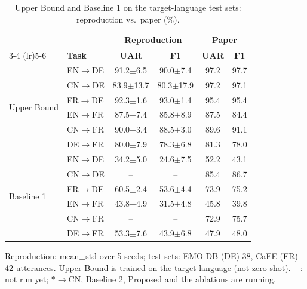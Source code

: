 \documentclass{article}
\newcommand{\pmstd}[1]{{\scriptsize$\pm$#1}}
\begin{document}
\begin{table}[t]
\centering
\caption{Upper Bound and Baseline 1 on the target-language test sets: reproduction vs.\ paper (\%).}
\label{tab:known_results}
\begin{tabular}{ll cc cc}
\toprule
 & & \multicolumn{2}{c}{\textbf{Reproduction}} & \multicolumn{2}{c}{\textbf{Paper}} \\
\cmidrule(lr){3-4} \cmidrule(lr){5-6}
 & \textbf{Task} & \textbf{UAR} & \textbf{F1} & \textbf{UAR} & \textbf{F1} \\
\midrule
\multirow{6}{*}{Upper Bound}
 & EN$\to$DE & 91.2\pmstd{6.5}  & 90.0\pmstd{7.4}  & 97.2 & 97.7 \\
 & CN$\to$DE & 83.9\pmstd{13.7} & 80.3\pmstd{17.9} & 97.2 & 97.1 \\
 & FR$\to$DE & 92.3\pmstd{1.6}  & 93.0\pmstd{1.4}  & 95.4 & 95.4 \\
 & EN$\to$FR & 87.5\pmstd{7.4}  & 85.8\pmstd{8.9}  & 87.5 & 84.4 \\
 & CN$\to$FR & 90.0\pmstd{3.4}  & 88.5\pmstd{3.0}  & 89.6 & 91.1 \\
 & DE$\to$FR & 80.0\pmstd{7.9}  & 78.3\pmstd{6.8}  & 81.3 & 78.0 \\
\midrule
\multirow{6}{*}{Baseline 1}
 & EN$\to$DE & 34.2\pmstd{5.0}  & 24.6\pmstd{7.5}  & 52.2 & 43.1 \\
 & CN$\to$DE & --               & --               & 85.4 & 86.7 \\
 & FR$\to$DE & 60.5\pmstd{2.4}  & 53.6\pmstd{4.4}  & 73.9 & 75.2 \\
 & EN$\to$FR & 43.8\pmstd{4.9}  & 31.5\pmstd{4.8}  & 45.8 & 39.8 \\
 & CN$\to$FR & --               & --               & 72.9 & 75.7 \\
 & DE$\to$FR & 53.3\pmstd{7.6}  & 43.9\pmstd{6.8}  & 47.9 & 48.0 \\
\bottomrule
\end{tabular}

\vspace{2pt}
{\footnotesize Reproduction: mean$\pm$std over 5 seeds; test sets: EMO-DB (DE) 38, CaFE (FR) 42 utterances.
Upper Bound is trained on the target language (not zero-shot).
-- : not run yet; $\ast\!\to$CN, Baseline 2, Proposed and the ablations are running.}
\end{table}
\end{document}
